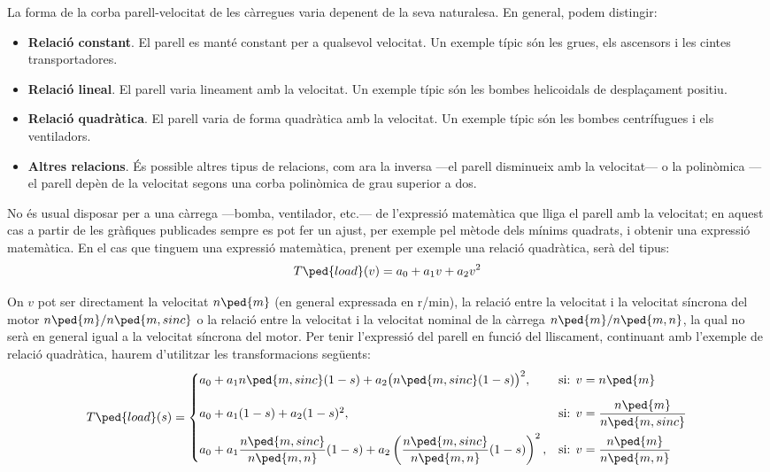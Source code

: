 La forma de la corba parell-velocitat de les càrregues varia depenent de la seva naturalesa. En general, podem distingir:
\begin{itemize}
	\item  \textbf{Relació constant}. El parell es manté constant per a qualsevol velocitat. Un exemple típic són les grues, els ascensors i les cintes transportadores.
	
	\item  \textbf{Relació lineal}. El parell varia lineament amb la velocitat. Un exemple típic són les bombes helicoidals de desplaçament positiu.
	
	\item  \textbf{Relació quadràtica}. El parell varia de forma  quadràtica  amb la velocitat. Un exemple típic són les bombes centrífugues i els ventiladors.
	
	\item  \textbf{Altres relacions}. És possible altres tipus de relacions, com ara la inversa ---el parell disminueix amb la velocitat--- o la polinòmica ---el parell depèn de la velocitat segons una corba polinòmica de grau superior a dos.
\end{itemize}

No és  usual disposar per a una càrrega ---bomba, ventilador, etc.---   de l'expressió matemàtica que lliga el parell amb la velocitat; en aquest cas a partir de les gràfiques publicades sempre es pot fer un ajust, per exemple pel mètode dels mínims quadrats, i obtenir una expressió matemàtica. En el cas que tinguem una expressió matemàtica, prenent per exemple una relació quadràtica, serà del tipus:
\begin{equation}
	T\ped{load}(v) = a_0 + a_1 v + a_2 v^2
\end{equation}

On $v$ pot ser directament la velocitat $n\ped{m}$ (en general expressada en r/min),  la relació entre la velocitat i la velocitat síncrona del motor $n\ped{m}/n\ped{m,sinc}$ o la relació entre la velocitat i la velocitat nominal de la càrrega $n\ped{m}/n\ped{m,n}$, la qual no serà en general igual a la velocitat síncrona del motor. Per  tenir l'expressió del parell en funció del lliscament,  continuant amb l'exemple de relació quadràtica, haurem d'utilitzar les transformacions següents:
\begin{equation}\label{eq:Tload-v-s}
	T\ped{load}(s) = \begin{cases}
		 a_0 + a_1 n\ped{m,sinc}(1-s) + a_2 \big(n\ped{m,sinc}(1-s)\big)^2,  & \text{si: } v=n\ped{m}  \\[2ex]
		a_0 + a_1 (1-s) + a_2 (1-s)^2, &   
		\text{si: } v =\dfrac{n\ped{m}}{n\ped{m,sinc}} \\[2ex]
		 a_0 + a_1 \dfrac{n\ped{m,sinc}}{n\ped{m,n}}(1-s) + a_2 \left(\dfrac{n\ped{m,sinc}}{n\ped{m,n}}(1-s)\right)^2, &  \text{si: }  v = \dfrac{n\ped{m}}{n\ped{m,n}}
	\end{cases}
\end{equation}


